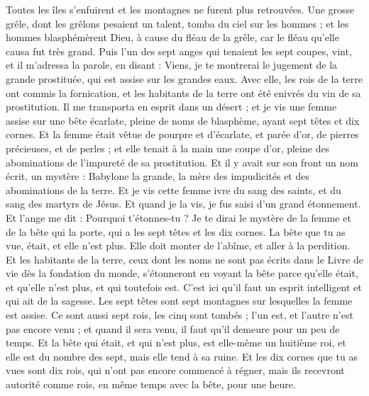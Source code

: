 \begin{multicols}{2}
Toutes les îles s'enfuirent et les montagnes ne furent plus retrouvées.
Une grosse grêle, dont les grêlons pesaient un talent, tomba du ciel sur les hommes ; et les hommes blasphémèrent Dieu, à cause du fléau de la grêle, car le fléau qu'elle causa fut très grand.
\VerseOne{}Puis l'un des sept anges qui tenaient les sept coupes, vint, et il m'adressa la parole, en disant : Viens, je te montrerai le jugement de la grande prostituée, qui est assise sur les grandes eaux.
Avec elle, les rois de la terre ont commis la fornication, et les habitants de la terre ont été enivrés du vin de sa prostitution.
Il me transporta en esprit dans un désert ; et je vis une femme assise sur une bête écarlate, pleine de noms de blasphème, ayant sept têtes et dix cornes.
Et la femme était vêtue de pourpre et d'écarlate, et parée d'or, de pierres précieuses, et de perles ; et elle tenait à la main une coupe d'or, pleine des abominations de l'impureté de sa prostitution.
Et il y avait sur son front un nom écrit, un mystère : Babylone la grande, la mère des impudicités et des abominations de la terre.
Et je vis cette femme ivre du sang des saints, et du sang des martyrs de Jésus. Et quand je la vis, je fus saisi d'un grand étonnement.
Et l'ange me dit : Pourquoi t'étonnes-tu ? Je te dirai le mystère de la femme et de la bête qui la porte, qui a les sept têtes et les dix cornes.
La bête que tu as vue, était, et elle n'est plus. Elle doit monter de l'abîme, et aller à la perdition. Et les habitants de la terre, ceux dont les noms ne sont pas écrits dans le Livre de vie dès la fondation du monde, s'étonneront en voyant la bête parce qu'elle était, et qu'elle n'est plus, et qui toutefois est.
C'est ici qu'il faut un esprit intelligent et qui ait de la sagesse. Les sept têtes sont sept montagnes sur lesquelles la femme est assise.
Ce sont aussi sept rois, les cinq sont tombés ; l'un est, et l'autre n'est pas encore venu ; et quand il sera venu, il faut qu'il demeure pour un peu de temps.
Et la bête qui était, et qui n'est plus, est elle-même un huitième roi, et elle est du nombre des sept, mais elle tend à sa ruine.
Et les dix cornes que tu as vues sont dix rois, qui n'ont pas encore commencé à régner, mais ils recevront autorité comme rois, en même temps avec la bête, pour une heure.

\end{multicols}
